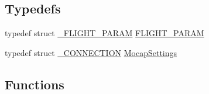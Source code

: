 \subsection*{\-Typedefs}
\begin{DoxyCompactItemize}
\item 
typedef struct \hyperlink{struct___f_l_i_g_h_t___p_a_r_a_m}{\-\_\-\-F\-L\-I\-G\-H\-T\-\_\-\-P\-A\-R\-A\-M} \hyperlink{group___mo_cap_plugin_ga7bda7a22b899fe8dff0ba9a0cae99da6}{\-F\-L\-I\-G\-H\-T\-\_\-\-P\-A\-R\-A\-M}
\item 
typedef struct \hyperlink{struct___c_o_n_n_e_c_t_i_o_n}{\-\_\-\-C\-O\-N\-N\-E\-C\-T\-I\-O\-N} \hyperlink{group___mo_cap_plugin_ga6083347a5b3eb70e360f599354dc0f0b}{\-Mocap\-Settings}
\end{DoxyCompactItemize}
\subsection*{\-Functions}
